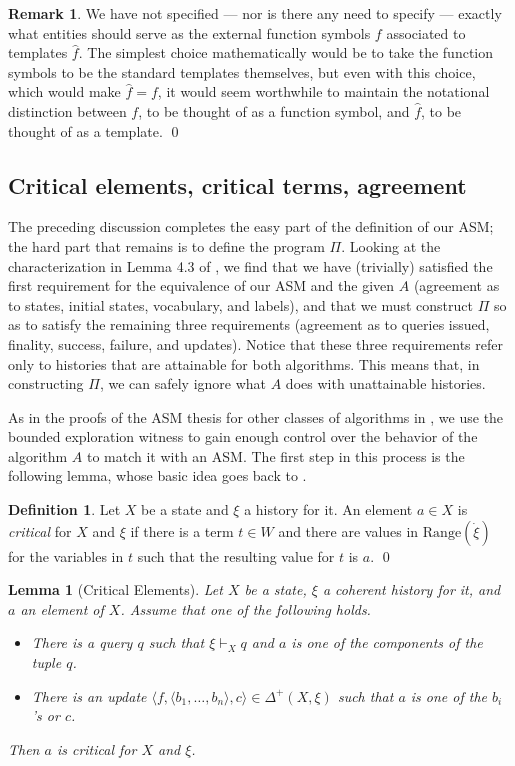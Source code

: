 \documentclass{LMCS}
\newtheorem{la}[thm]{Lemma}
\theoremstyle{definition}
\newtheorem{df}[thm]{Definition}
\newtheorem{rmk}[thm]{Remark}
\newenvironment{ls}{\begin{itemize}}{\end{itemize}}
\newcommand{\DD}{\Delta^+}
\newcommand{\ans}{\dot}
\newcommand{\ran}[1]{\ensuremath{{\text{Range}}(#1)}}
\newcommand{\sq}[1]{\ensuremath{\langle#1\rangle}}
\begin{document}
\begin{rmk}
We have not specified --- nor is there any need to specify --- exactly
what entities should serve as the external function symbols $f$
associated to templates $\hat f$.  The simplest choice mathematically
would be to take the function symbols to be the standard templates
themselves, but even with this choice, which would make $\hat f=f$, it
would seem worthwhile to maintain the notational distinction between
$f$, to be thought of as a function symbol, and $\hat f$, to be
thought of as a template.
\qed\end{rmk}

\subsection{Critical elements, critical terms, agreement}

The preceding discussion completes the easy part of the definition
of our ASM; the hard part that remains is to define the program
$\Pi$. Looking at the characterization in Lemma 4.3 of \cite{ga1},
we find that we have (trivially) satisfied the first requirement for
the equivalence of our ASM and the given $A$ (agreement as to
states, initial states, vocabulary, and labels), and that we must
construct $\Pi$ so as to satisfy the remaining three requirements
(agreement as to queries issued, finality, success, failure, and
updates).  Notice that these three requirements refer only to
histories that are attainable for both algorithms.  This means that,
in constructing $\Pi$, we can safely ignore what $A$ does with
unattainable histories.

As in the proofs of the ASM thesis for other classes of algorithms in
\cite{seqth, parth, oa3}, we use the bounded exploration witness to gain
enough control over the behavior of the algorithm $A$ to match it with
an ASM.  The first step in this process is the following lemma, whose
basic idea goes back to \cite{seqth}.

\begin{df}
  Let $X$ be a state and $\xi$ a history for it.  An element $a\in X$
  is \emph{critical} for $X$ and $\xi$ if there is a term $t\in W$ and
  there are values in $\ran{\ans\xi}$ for the variables in $t$ such
  that the resulting value for $t$ is $a$.
\qed\end{df}

\begin{la}[Critical Elements]    \label{crit-la}
Let $X$ be a state, $\xi$ a coherent history for it, and $a$ an
element of $X$. Assume that one of the following holds.
\begin{ls}
  \item There is a query $q$ such that $\xi\vdash_Xq$ and $a$ is one
  of the components of the tuple $q$.
  \item There is an update $\sq{f,\sq{b_1,\dots,b_n},c}\in\DD(X,\xi)$
  such that $a$ is one of the $b_i$'s or $c$.
\end{ls}
Then $a$ is critical for $X$ and $\xi$.
\end{la}
\end{document}
